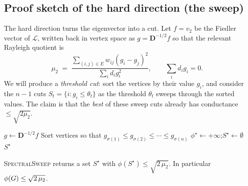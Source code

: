 \subsection{Proof sketch of the hard direction (the sweep)}

The hard direction turns the eigenvector into a cut. Let $f=v_2$ be the Fiedler vector of $\mathcal{L}$, written back in vertex space as $g=\mathbf{D}^{-1/2}f$ so that the relevant Rayleigh quotient is
\[
  \mu_2 \;=\; \frac{\sum_{(i,j)\in E} w_{ij}(g_i-g_j)^2}{\sum_i d_i g_i^2},
  \qquad \sum_i d_i g_i = 0 .
\]
We will produce a \emph{threshold cut}: sort the vertices by their value $g_i$, and consider the $n-1$ cuts $S_t=\{i : g_i \le \theta_t\}$ as the threshold $\theta_t$ sweeps through the sorted values. The claim is that the \emph{best} of these sweep cuts already has conductance $\le\sqrt{2\mu_2}$.

\begin{algorithm}[H]
\caption{\textsc{SpectralSweep} -- rounding a Fiedler vector to a cut}
\label{ch32:alg-sweep}
$g \leftarrow \mathbf{D}^{-1/2} f$\;
Sort vertices so that $g_{\sigma(1)}\le g_{\sigma(2)}\le\cdots\le g_{\sigma(n)}$\;
$\phi^\star \leftarrow +\infty$;\quad $S^\star\leftarrow\emptyset$\;
\Return $S^\star$\;
\end{algorithm}

\begin{theorem}
\label{ch32:sweep-guarantee}
\textsc{SpectralSweep} returns a set $S^\star$ with $\phi(S^\star)\le\sqrt{2\,\mu_2}$. In particular $\phi(G)\le\sqrt{2\,\mu_2}$.
\end{theorem}

